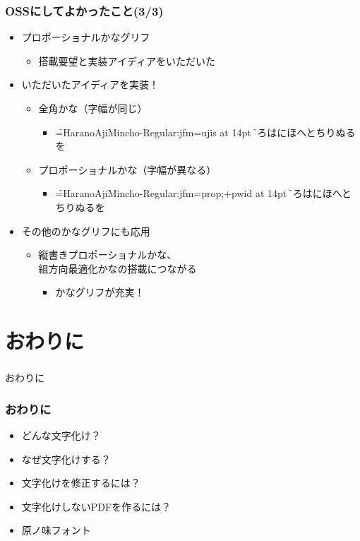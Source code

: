 \begin{frame}\frametitle{OSSにしてよかったこと(3/3)}
  \begin{itemize}
  \item プロポーショナルかなグリフ
    \begin{itemize}
    \item 搭載要望と実装アイディアをいただいた
    \end{itemize}
  \item いただいたアイディアを実装！
    \begin{itemize}
    \item 全角かな（字幅が同じ）
      \begin{itemize}
      \item
        \jfont\f=HaranoAjiMincho-Regular:jfm=ujis at 14pt \f
        いろはにほへとちりぬるを
      \end{itemize}
    \item プロポーショナルかな（字幅が異なる）
      \begin{itemize}
      \item \jfont\f=HaranoAjiMincho-Regular:jfm=prop;+pwid at 14pt \f
        いろはにほへとちりぬるを
      \end{itemize}
    \end{itemize}
  \item その他のかなグリフにも応用
    \begin{itemize}
    \item 縦書きプロポーショナルかな、 \\
      組方向最適化かなの搭載につながる
      \begin{itemize}
      \item かなグリフが充実！
      \end{itemize}
    \end{itemize}
  \end{itemize}
\end{frame}

\section{おわりに}
\begin{frame}\frametitle{}
  \centering
  おわりに
\end{frame}

\begin{frame}\frametitle{おわりに}
  \begin{itemize}
  \item どんな文字化け？
  \item なぜ文字化けする？
  \item 文字化けを修正するには？
  \item 文字化けしないPDFを作るには？
  \item 原ノ味フォント
  \end{itemize}
\end{frame}

